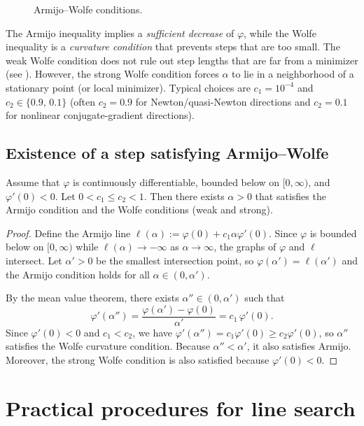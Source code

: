 \begin{figure}[ht]
    \centering
    \caption{Armijo--Wolfe conditions.}
    \label{fig:armijo-wolfe-conditions}
\end{figure}
\noindent The Armijo inequality implies a \emph{sufficient decrease} of
$\varphi$, while the Wolfe inequality is a \emph{curvature condition} that
prevents steps that are too small.
The weak Wolfe condition does not rule out step lengths that are far from a minimizer
(see ). However, the strong Wolfe condition forces $\alpha$ to lie in a
neighborhood of a stationary point (or local minimizer).
Typical choices are $c_1=10^{-4}$ and
$c_2\in\{0.9,\,0.1\}$ (often $c_2=0.9$ for Newton/quasi-Newton directions and
$c_2=0.1$ for nonlinear conjugate-gradient directions).



\subsection{Existence of a step satisfying Armijo--Wolfe}
\begin{theorem}
Assume that $\varphi$ is continuously differentiable, bounded below on
$[0,\infty)$, and $\varphi'(0)<0$. Let $0<c_1\le c_2<1$. Then there exists
$\alpha >0$ that satisfies the Armijo condition and the Wolfe conditions (weak and strong).
\end{theorem}


\begin{proof}
Define the Armijo line
$\ell(\alpha):=\varphi(0)+c_1\alpha\varphi'(0)$. Since $\varphi$ is bounded
below on $[0,\infty)$ while $\ell(\alpha)\to -\infty$ as $\alpha\to\infty$,
the graphs of $\varphi$ and $\ell$ intersect. Let $\alpha'>0$ be the smallest
intersection point, so $\varphi(\alpha')=\ell(\alpha')$ and the Armijo
condition holds for all $\alpha\in(0,\alpha')$.

By the mean value theorem, there exists $\alpha''\in(0,\alpha')$ such that
\[
  \varphi'(\alpha'')=\frac{\varphi(\alpha')-\varphi(0)}{\alpha'}
  =c_1\,\varphi'(0).
\]
Since $\varphi'(0)<0$ and $c_1<c_2$, we have
$\varphi'(\alpha'')=c_1\varphi'(0)\ge c_2\varphi'(0)$, so $\alpha''$ satisfies
the Wolfe curvature condition. Because $\alpha''<\alpha'$, it also satisfies
Armijo. Moreover, the strong Wolfe condition is also satisfied because $\varphi'(0) < 0 $.
\end{proof}
\section{Practical procedures for line search}
